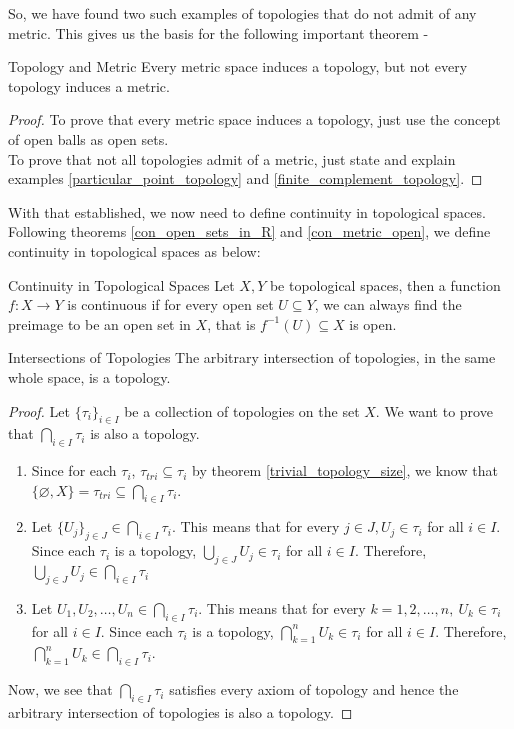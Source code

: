 \noindent So, we have found two such examples of topologies that do not admit of any metric. This gives us the basis for the following important theorem -
\begin{Theorem}{Topology and Metric}\label{every_topology_no_metric}
    Every metric space induces a topology, but not every topology induces a metric.
\end{Theorem}
\begin{proof}
    To prove that every metric space induces a topology, just use the concept of open balls as open sets.\\
    To prove that not all topologies admit of a metric, just state and explain examples \eqref{particular_point_topology} and \eqref{finite_complement_topology}.
\end{proof}
\noindent With that established, we now need to define continuity in topological spaces. Following theorems \eqref{con_open_sets_in_R} and \eqref{con_metric_open}, we define continuity in topological spaces as below:
\begin{Definition}{Continuity in Topological Spaces}\label{con_topological_spaces}
    Let $X, Y$ be topological spaces, then a function $f:X \rightarrow Y$ is continuous if for every open set $U\subseteq Y$, we can always find the preimage to be an open set in $X$, that is $f^{-1}(U)\subseteq X$ is open.
\end{Definition}
\begin{Theorem}{Intersections of Topologies}\label{intersection_topology}
    The arbitrary intersection of topologies, in the same whole space, is a topology.
\end{Theorem}
\begin{proof}
    Let $\{\tau_i\}_{i\in I}$ be a collection of topologies on the set $X$. We want to prove that $\bigcap_{i\in I}\tau_i$ is also a topology.
    \begin{enumerate}
        \item Since for each $\tau_i$, $\tau_{tri}\subseteq\tau_i$ by theorem \eqref{trivial_topology_size}, we know that $\{\varnothing,X\}=\tau_{tri}\subseteq\bigcap_{i\in I}\tau_i$.
        \item Let $\{U_j\}_{j\in J}\in\bigcap_{i\in I}\tau_i$. This means that for every $j\in J, U_j\in\tau_i$ for all $i\in I$. Since each $\tau_i$ is a topology, $\bigcup_{j\in J}U_j\in\tau_i$ for all $i\in I$. Therefore, $\bigcup_{j\in J}U_j\in\bigcap_{i\in I}\tau_i$
        \item Let $U_1,U_2,\dots,U_n\in\bigcap_{i\in I}\tau_i$. This means that for every $k=1,2,\dots,n,\ U_k\in\tau_i$ for all $i\in I$. Since each $\tau_i$ is a topology, $\bigcap_{k=1}^nU_k\in\tau_i$ for all $i\in I$. Therefore, $\bigcap_{k=1}^nU_k\in\bigcap_{i\in I}\tau_i$.
    \end{enumerate}
    Now, we see that $\bigcap_{i\in I}\tau_i$ satisfies every axiom of topology and hence the arbitrary intersection of topologies is also a topology.
\end{proof}
